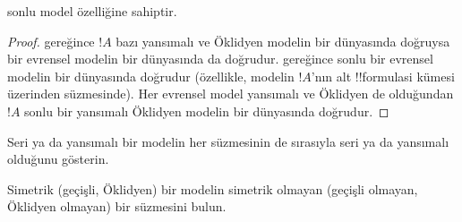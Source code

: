 \documentclass[../../../include/open-logic-section]{subfiles}
\begin{document}
\begin{cor}
   sonlu model özelliğine sahiptir.
\end{cor}

\begin{proof}
   gereğince $!A$ bazı yansımalı ve Öklidyen
  modelin bir dünyasında doğruysa bir evrensel modelin bir dünyasında da
  doğrudur.  gereğince sonlu bir evrensel modelin bir
  dünyasında doğrudur (özellikle, modelin $!A$'nın alt !!{formula}s{}i kümesi
  üzerinden süzmesinde). Her evrensel model yansımalı ve Öklidyen de
  olduğundan $!A$ sonlu bir yansımalı Öklidyen modelin bir dünyasında
  doğrudur.
\end{proof}

\begin{prob}
  Seri ya da yansımalı bir modelin her süzmesinin de sırasıyla seri ya da
  yansımalı olduğunu gösterin.
\end{prob}

\begin{prob}
  Simetrik (geçişli, Öklidyen) bir modelin simetrik olmayan (geçişli olmayan,
  Öklidyen olmayan) bir süzmesini bulun.
\end{prob}
\end{document}
